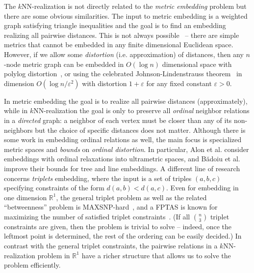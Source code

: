 The $k$NN-realization is not directly related to the
\emph{metric embedding} problem but there are some obvious similarities. The input to metric embedding is a weighted graph satisfying triangle inequalities and the goal is to find an embedding realizing all pairwise distances. This is not always possible~\cite{matousek-book} -- there are simple metrics that cannot be embedded in any finite dimensional Euclidean space. However, if we allow some \emph{distortion} (i.e. approximation) of distances, then any $n$-node metric graph can be embedded in $O(\log n)$ dimensional space with polylog distortion~\cite{bourgain}, or using the celebrated Johnson-Lindenstrauss theorem~\cite{johnson:1984} in dimension $O(\log n /\varepsilon^2 )$ with distortion $1 + \varepsilon$ for any fixed constant $\varepsilon > 0$.

In metric embedding the goal is to realize all pairwise distances (approximately), while in $k$NN-realization the goal is only to preserve all \emph{ordinal} neighbor relations in a \emph{directed} graph: a neighbor of each vertex must be closer than any of its non-neighbors but the choice of specific distances does not matter.
Although  there is some work in embedding ordinal relations as well, the main focus is specialized metric spaces and \emph{bounds} on \emph{ordinal distortion}.
In particular, Alon et al. \cite{alon2008} consider embeddings with ordinal relaxations into ultrametric spaces, and Bădoiu et al. \cite{badoiu2008} improve their bounds for tree and line embeddings.
A different line of research concerns \emph{triplets} embedding, where the input is a set of triples $(a, b, c)$ specifying constraints of the form $d(a, b) < d(a, c)$.
Even for embedding in one dimension $\mathbb{R}^1$, the general triplet problem as well as the related ``betweenness'' problem is MAXSNP-hard~\cite{ChorSudan}, and a FPTAS is known for maximizing the number of satisfied triplet constraints~\cite{fan2020}.
(If all $\binom{n}{3}$ triplet constraints are given, then the problem is trivial to solve -- indeed, once the leftmost point is determined, the rest of the ordering can be easily decided.)
In contrast with the general triplet constraints, the pairwise relations in a $k$NN-realization problem in $\mathbb{R}^1$ have a richer structure that allows us to solve the problem efficiently. 

